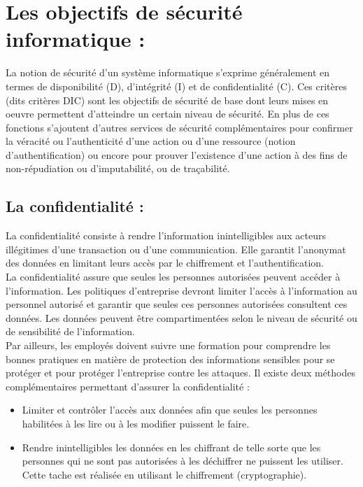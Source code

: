\section{Les objectifs de sécurité informatique : }
La notion de sécurité d’un système informatique s’exprime généralement en termes de disponibilité (D), d’intégrité (I) et de confidentialité (C)\cite{ref4}. Ces critères (dits critères DIC) sont les objectifs de sécurité de base dont leurs mises en oeuvre permettent d’atteindre un certain niveau de sécurité. En plus de ces fonctions s’ajoutent d’autres services de sécurité complémentaires pour confirmer la véracité ou l’authenticité d’une action ou d’une ressource (notion d’authentification) ou encore pour prouver l’existence d’une action à des fins de non-répudiation ou d’imputabilité, ou de traçabilité.\\
\cia
\subsection{La confidentialité : }
La confidentialité consiste à rendre l'information inintelligibles aux acteurs illégitimes d’une transaction ou d’une communication. Elle garantit l’anonymat des données en limitant leurs accès par le chiffrement et l’authentification.\\
La confidentialité assure que seules les personnes autorisées peuvent accéder à l’information. Les politiques d’entreprise devront limiter l’accès à l’information au personnel autorisé et garantir que seules ces personnes autorisées consultent ces données. Les données peuvent être compartimentées selon le niveau de sécurité ou de
sensibilité de l’information.\\
Par ailleurs, les employés doivent suivre une formation pour comprendre les bonnes pratiques en matière de protection des informations sensibles pour se protéger et pour protéger l’entreprise contre les attaques. Il existe deux méthodes complémentaires permettant d’assurer la confidentialité :
\begin{itemize}[label=\textbullet]
	\item Limiter et contrôler l’accès aux données afin que seules les personnes habilitées à les lire ou à les modifier puissent le faire.
	\item Rendre inintelligibles les données en les chiffrant de telle sorte que les personnes qui ne sont pas autorisées à les déchiffrer ne puissent les utiliser. Cette tache est réalisée en utilisant le chiffrement (cryptographie).
\end{itemize}
